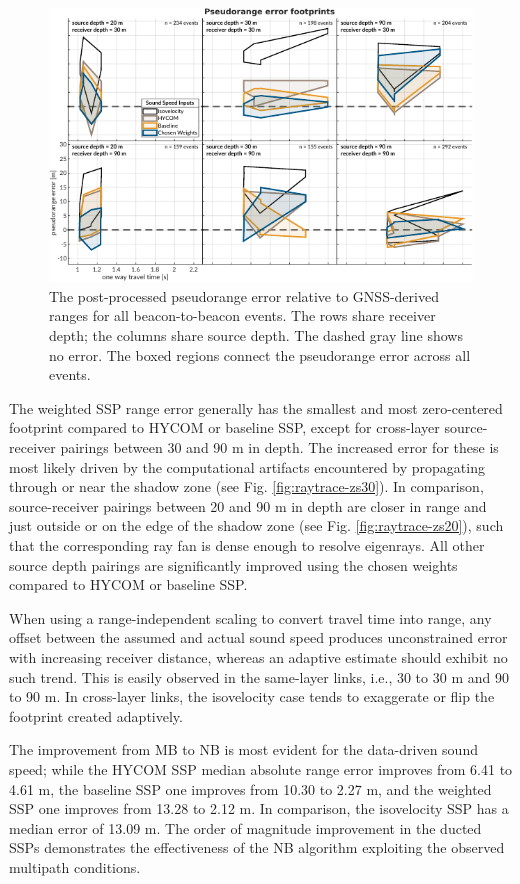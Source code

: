\documentclass[preprint,TurnOnLineNumbers]{JASA}
\begin{document}
\begin{figure}[!ht]
\includegraphics[width=\columnwidth]{Fig10.pdf}
\caption{The post-processed pseudorange error relative to GNSS-derived ranges for all beacon-to-beacon events. The rows share receiver depth; the columns share source depth. The dashed gray line shows no error. The boxed regions connect the pseudorange error across all events.}
\label{fig:rangeError}
\end{figure}

The weighted SSP range error generally has the smallest and most zero-centered footprint compared to HYCOM or baseline SSP, except for cross-layer source-receiver pairings between 30 and 90 m in depth.
The increased error for these is most likely driven by the computational artifacts encountered by propagating through or near the shadow zone (see Fig. \ref{fig:raytrace-zs30}).
In comparison, source-receiver pairings between 20 and 90 m in depth are closer in range and just outside or on the edge of the shadow zone (see Fig. \ref{fig:raytrace-zs20}), such that the corresponding ray fan is dense enough to resolve eigenrays.
All other source depth pairings are significantly improved using the chosen weights compared to HYCOM or baseline SSP.

When using a range-independent scaling to convert travel time into range, any offset between the assumed and actual sound speed produces unconstrained error with increasing receiver distance, whereas an adaptive estimate should exhibit no such trend.
This is easily observed in the same-layer links, i.e., 30 to 30 m and 90 to 90 m.
In cross-layer links, the isovelocity case tends to exaggerate or flip the footprint created adaptively.

The improvement from MB to NB is most evident for the data-driven sound speed; while the HYCOM SSP median absolute range error improves from 6.41 to 4.61 m, the baseline SSP one improves from 10.30 to 2.27 m, and the weighted SSP one improves from 13.28 to 2.12 m.
In comparison, the isovelocity SSP has a median error of 13.09 m.
The order of magnitude improvement in the ducted SSPs demonstrates the effectiveness of the NB algorithm exploiting the observed multipath conditions.
\end{document}
